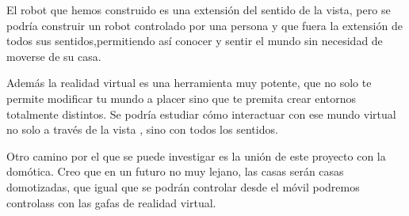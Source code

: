 \documentclass[twoside, 12pt]{epstfg}
\begin{document}
El robot que hemos construido es una extensión del sentido de la vista, pero se podría construir un robot controlado por una persona y que fuera la extensión de todos sus sentidos,permitiendo así conocer y sentir el mundo sin necesidad de moverse de su casa.

Además la realidad virtual es una herramienta muy potente, que no solo te permite modificar tu mundo a placer sino que te premita crear entornos totalmente distintos. Se podría estudiar cómo interactuar con ese mundo virtual no solo a través de la vista , sino con todos los sentidos.

Otro camino por el que se puede investigar es la unión de este proyecto con la domótica.
Creo que en un futuro no muy lejano, las casas serán casas domotizadas, que igual que se podrán controlar desde el móvil podremos controlass con las gafas de realidad virtual.

\backmatter
\appendix

\cleardoublepage

\nocite{*}
{}

\cleardoublepage
\printindex
\end{document}
